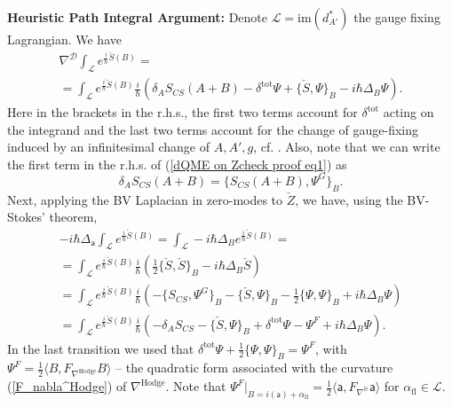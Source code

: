 \documentclass[11pt,a4paper]{amsart}
\theoremstyle{plain} %
\theoremstyle{definition}
\theoremstyle{remark}
\newcommand{\HH}{\mathbb{H}}
\newcommand{\mr}{\mathrm}
\newcommand{\sfa}{\mathsf{a}}
\newcommand{\mc}{\mathcal}
\newcommand{\UU}{\underline{\mc{U}}}
\begin{document}
{%
\textbf{Heuristic Path Integral Argument:}
Denote $\mc{L}=\mr{im}(d^*_{A'})$ the gauge fixing Lagrangian. We have
\begin{multline}\label{dQME on Zcheck proof eq1}
    \nabla^\mc{D} \int_{\mc{L}} e^{\frac{i}{\hbar} \check{S}(B)}=\\=
    \int_{\mc{L}} e^{\frac{i}{\hbar} \check{S}(B)} \frac{i}{\hbar}(\delta_A S_{CS}(A+B)-\delta^\mr{tot}\Psi+\{\check{S},\Psi\}_B-i\hbar \Delta_B\Psi).
\end{multline}
Here in the brackets in the r.h.s., the first two terms account for $\delta^\mr{tot}$ acting on the integrand and the last two terms account for the change of gauge-fixing induced by an infinitesimal change of $A,A',g$, cf. \cite[Proposition 2]{Cattaneo2008}.
Also, note that we can write the first term in the r.h.s. of (\ref{dQME on Zcheck proof eq1}) as 
$$\delta_A S_{CS}(A+B)=\{S_{CS}(A+B), \Psi^G \}_B.$$ 
Next, applying the BV Laplacian in zero-modes to $\check{Z}$, we have, using the BV-Stokes' theorem,
\begin{multline}\label{dQME on Zcheck proof eq2}
    -i\hbar\Delta_\sfa \int_{\mc{L}} e^{\frac{i}{\hbar} \check{S}(B)}=
    \int_{\mc{L}} -i\hbar\Delta_B e^{\frac{i}{\hbar} \check{S}(B)}
    =\\=
     \int_{\mc{L}}e^{\frac{i}{\hbar} \check{S}(B)} \frac{i}{\hbar}(\frac12\{\check{S},\check{S}\}_B-i\hbar \Delta_B \check{S})
     \\
     =\int_{\mc{L}}e^{\frac{i}{\hbar} \check{S}(B)} \frac{i}{\hbar}(
     -\{S_{CS},\Psi^G\}_B-\{\check{S},\Psi\}_B-\frac12 \{\Psi,\Psi\}_B+i\hbar \Delta_B \Psi
     )\\
     =\int_{\mc{L}}e^{\frac{i}{\hbar} \check{S}(B)} \frac{i}{\hbar}(
     -\delta_AS_{CS}-\{\check{S},\Psi\}_B+\delta^\mr{tot}\Psi-\Psi^F+i\hbar \Delta_B \Psi
     )
     .
\end{multline}
In the last transition we used that
$\delta^\mr{tot}\Psi+\frac12\{\Psi,\Psi\}_B=\Psi^F$, with $\Psi^F=\frac12 \langle B,F_{\nabla^\mr{Hodge}} B\rangle$ -- the quadratic form associated with the curvature (\ref{F_nabla^Hodge}) of $\nabla^\mr{Hodge}$. Note that $\Psi^F|_{B=i(\sfa)+\alpha_\mr{fl}}=\frac12 \langle \sfa,F_{\nabla^\HH} \sfa\rangle$ for $\alpha_\mr{fl}\in\mc{L}$.

}
\end{document}
